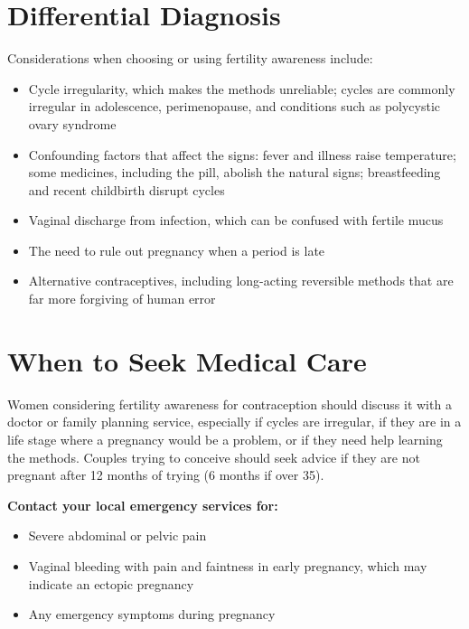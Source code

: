\section*{Differential Diagnosis}
Considerations when choosing or using fertility awareness include:
\begin{itemize}
    \item Cycle irregularity, which makes the methods unreliable; cycles are commonly irregular in adolescence, perimenopause, and conditions such as polycystic ovary syndrome
    \item Confounding factors that affect the signs: fever and illness raise temperature; some medicines, including the pill, abolish the natural signs; breastfeeding and recent childbirth disrupt cycles
    \item Vaginal discharge from infection, which can be confused with fertile mucus
    \item The need to rule out pregnancy when a period is late
    \item Alternative contraceptives, including long-acting reversible methods that are far more forgiving of human error
\end{itemize}

\section*{When to Seek Medical Care}
Women considering fertility awareness for contraception should discuss it with a doctor or family planning service, especially if cycles are irregular, if they are in a life stage where a pregnancy would be a problem, or if they need help learning the methods. Couples trying to conceive should seek advice if they are not pregnant after 12 months of trying (6 months if over 35).

\textbf{Contact your local emergency services for:}
\begin{itemize}
    \item Severe abdominal or pelvic pain
    \item Vaginal bleeding with pain and faintness in early pregnancy, which may indicate an ectopic pregnancy
    \item Any emergency symptoms during pregnancy
\end{itemize}

